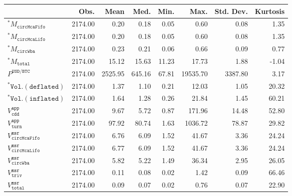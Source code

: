 \begin{tabular}{lrrrrrrr}
  \hline
 & Obs. & Mean & Med. & Min. & Max. & Std. Dev. & Kurtosis \\ 
  \hline
$ ^{\ast} M_{\mathtt{circMcaFifo}}$ & 2174.00 & 0.20 & 0.18 & 0.05 & 0.60 & 0.08 & 1.35 \\ 
  $ ^{\ast} M_{\mathtt{circMcaLifo}}$ & 2174.00 & 0.20 & 0.18 & 0.05 & 0.60 & 0.08 & 1.35 \\ 
  $ ^{\ast} M_{\mathtt{circWba}}$ & 2174.00 & 0.23 & 0.21 & 0.06 & 0.66 & 0.09 & 0.77 \\ 
  $ ^{\ast} M_{\mathtt{total}}$ & 2174.00 & 15.12 & 15.63 & 11.23 & 17.73 & 1.88 & -1.04 \\ 
  $P^{\mathtt{USD}/\mathtt{BTC}}$ & 2174.00 & 2525.95 & 645.16 & 67.81 & 19535.70 & 3387.80 & 3.17 \\ 
  $ ^{\ast} \mathtt{Vol.(deflated)}$ & 2174.00 & 1.37 & 1.10 & 0.21 & 12.03 & 1.05 & 20.32 \\ 
  $ ^{\ast} \mathtt{Vol.(inflated)}$ & 2174.00 & 1.64 & 1.28 & 0.26 & 21.84 & 1.45 & 60.21 \\ 
  $V^{\mathtt{app}}_{\mathtt{cdd}}$ & 2174.00 & 9.67 & 5.72 & 0.87 & 171.96 & 14.48 & 52.80 \\ 
  $V^{\mathtt{app}}_{\mathtt{turn}}$ & 2174.00 & 97.92 & 80.74 & 1.63 & 1036.72 & 78.87 & 29.82 \\ 
  $V^{\mathtt{msr}}_{\mathtt{circMcaFifo}}$ & 2174.00 & 6.76 & 6.09 & 1.52 & 41.67 & 3.36 & 24.24 \\ 
  $V^{\mathtt{msr}}_{\mathtt{circMcaLifo}}$ & 2174.00 & 6.77 & 6.09 & 1.52 & 41.67 & 3.36 & 24.24 \\ 
  $V^{\mathtt{msr}}_{\mathtt{circWba}}$ & 2174.00 & 5.82 & 5.22 & 1.49 & 36.34 & 2.95 & 26.05 \\ 
  $V^{\mathtt{msr}}_{\mathtt{triv}}$ & 2174.00 & 0.11 & 0.08 & 0.02 & 1.42 & 0.09 & 66.46 \\ 
  $V^{\mathtt{msr}}_{\mathtt{total}}$ & 2174.00 & 0.09 & 0.07 & 0.02 & 0.76 & 0.07 & 22.90 \\ 
   \hline
\end{tabular}
